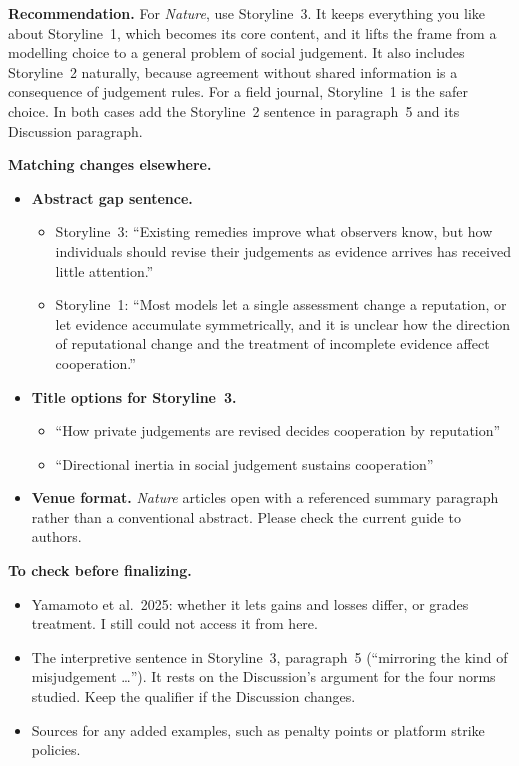 \documentclass[11pt]{article}
\begin{document}
\textbf{Recommendation.} For \textit{Nature}, use Storyline~3. It keeps everything you like about Storyline~1, which becomes its core content, and it lifts the frame from a modelling choice to a general problem of social judgement. It also includes Storyline~2 naturally, because agreement without shared information is a consequence of judgement rules. For a field journal, Storyline~1 is the safer choice. In both cases add the Storyline~2 sentence in paragraph~5 and its Discussion paragraph.

\textbf{Matching changes elsewhere.}
\begin{itemize}[leftmargin=1.2em]
\item \textbf{Abstract gap sentence.}
  \begin{itemize}[leftmargin=1.2em]
  \item Storyline~3: ``Existing remedies improve what observers know, but how individuals should revise their judgements as evidence arrives has received little attention.''
  \item Storyline~1: ``Most models let a single assessment change a reputation, or let evidence accumulate symmetrically, and it is unclear how the direction of reputational change and the treatment of incomplete evidence affect cooperation.''
  \end{itemize}
\item \textbf{Title options for Storyline~3.}
  \begin{itemize}[leftmargin=1.2em]
  \item ``How private judgements are revised decides cooperation by reputation''
  \item ``Directional inertia in social judgement sustains cooperation''
  \end{itemize}
\item \textbf{Venue format.} \textit{Nature} articles open with a referenced summary paragraph rather than a conventional abstract. Please check the current guide to authors.
\end{itemize}

\textbf{To check before finalizing.}
\begin{itemize}[leftmargin=1.2em]
\item Yamamoto et al.\ 2025\cite{yamamoto2025}: whether it lets gains and losses differ, or grades treatment. I still could not access it from here.
\item The interpretive sentence in Storyline~3, paragraph~5 (``mirroring the kind of misjudgement \dots''). It rests on the Discussion's argument for the four norms studied. Keep the qualifier if the Discussion changes.
\item Sources for any added examples, such as penalty points or platform strike policies.
\end{itemize}



\end{document}
